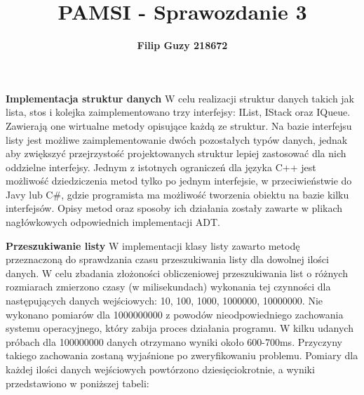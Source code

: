 \documentclass[10pt, a4paper]{article}
\title{\textbf{PAMSI - Sprawozdanie 3}}
\author{\textbf{Filip Guzy 218672}}
\begin{document}
\maketitle

\begin{flushleft}
\textbf{Implementacja struktur danych} \newline \newline
W celu realizacji struktur danych takich jak lista, stos i kolejka zaimplementowano trzy interfejsy: IList, IStack oraz IQueue. Zawierają one wirtualne metody opisujące każdą ze struktur. Na bazie interfejsu listy jest możliwe zaimplementowanie dwóch pozostałych typów danych, jednak aby zwiększyć przejrzystość projektowanych struktur lepiej zastosować dla nich oddzielne interfejsy. Jednym z istotnych ograniczeń dla języka C++ jest możliwość dziedziczenia metod tylko po jednym interfejsie, w przeciwieństwie do Javy lub C\#, gdzie programista ma możliwość tworzenia obiektu na bazie kilku interfejsów. Opisy metod oraz sposoby ich działania zostały zawarte w plikach nagłówkowych odpowiednich implementacji ADT. \newline

\textbf{Przeszukiwanie listy} \newline \newline
W implementacji klasy listy zawarto metodę przeznaczoną do sprawdzania czasu przeszukiwania listy dla dowolnej ilości danych. W celu zbadania złożoności obliczeniowej przeszukiwania list o różnych rozmiarach zmierzono czasy (w milisekundach) wykonania tej czynności dla następujących danych wejściowych: 10, 100, 1000, 1000000, 10000000. Nie wykonano pomiarów dla 1000000000 z powodów nieodpowiedniego zachowania systemu operacyjnego, który zabija proces działania programu. W kilku udanych próbach dla 100000000 danych otrzymano wyniki około 600-700ms. Przyczyny takiego zachowania zostaną wyjaśnione po zweryfikowaniu problemu. Pomiary dla każdej ilości danych wejściowych powtórzono dziesięciokrotnie, a wyniki przedstawiono w poniższej tabeli:


\end{flushleft}
\end{document}
